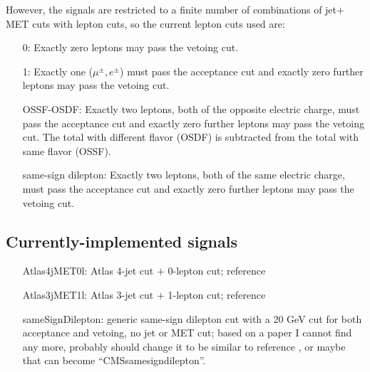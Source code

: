\documentclass[10pt]{article}
\begin{document}
However, the signals are restricted to a finite number of combinations of
 jet$+$MET cuts with lepton cuts, so the current lepton cuts used are:
\begin{itemize}

\item[0:] Exactly zero leptons may pass the vetoing cut.

\item[1:] Exactly one (${\mu}^{\pm}, e^{\pm}$) must pass the acceptance cut
          and exactly zero further leptons may pass the vetoing cut.

\item[OSSF-OSDF:] Exactly two leptons, both of the opposite electric
                  charge, must pass the acceptance cut and exactly zero further
                  leptons may pass the vetoing cut. The total with different
                  flavor (OSDF) is subtracted from the total with same flavor
                  (OSSF).

\item[same-sign dilepton:] Exactly two leptons, both of the same electric
                           charge, must pass the acceptance cut and exactly zero
                           further leptons may pass the vetoing cut.

\end{itemize}


\subsection{Currently-implemented signals}
\label{subsec:currentSignals}

\begin{itemize}

\item[Atlas4jMET0l:] Atlas 4-jet cut $+$ 0-lepton cut;
                     reference \cite{ATLAS:1278474}

\item[Atlas3jMET1l:] Atlas 3-jet cut $+$ 1-lepton cut;
                     reference \cite{ATLAS:1278474}

\item[sameSignDilepton:] generic same-sign dilepton cut with a 20 GeV cut for
                         both acceptance and vetoing, no jet or MET cut;
                         based on a paper I cannot find any more, probably
                         should change it to be similar to reference
                         \cite{Chatrchyan:2011wba}, or maybe that can become
                         ``CMSsamesigndilepton''.

\end{itemize}
\end{document}
